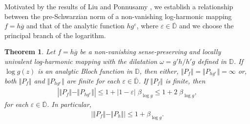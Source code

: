 \documentclass[12pt,reqno]{amsart}
\newtheorem{thm}{Theorem}[section]
\newtheorem{open problem}{Open problem}[section]
\newcommand{\ol}{\overline}
\newcommand{\beas}{\begin{eqnarray*}}
\newcommand{\eeas}{\end{eqnarray*}}
\renewcommand{\epsilon}{\varepsilon}
\numberwithin{equation}{section}
\begin{document}
\noindent Motivated by the results of Liu and Ponnusamy \cite{2LP2018}, we establish a relationship between the pre-Schwarzian norm of a non-vanishing log-harmonic mapping $f = h\overline{g}$ and that of the analytic function $hg^{\epsilon}$, where $\epsilon \in \overline{\mathbb{D}}$ and we choose the principal branch of the logarithm.
\begin{thm}\label{Th1}
Let $f=h\overline{g}$ be a non-vanishing sense-preserving and locally univalent log-harmonic mapping with the dilatation $\omega=g'h/h'g$ defined in $\mathbb{D}$. If $\log{g(z)}$ is an analytic Bloch function in $\mathbb{D}$, then either, $\Vert P_f \Vert =\Vert P_{hg^{\epsilon}}\Vert =\infty$ or, both $\Vert P_f \Vert $ and $\Vert P_{hg^{\epsilon}}\Vert $ are finite for each $\epsilon\in\ol{\mathbb{D}}$. If $\Vert P_f \Vert $ is finite, then
\beas
\left|\Vert P_f \Vert -\Vert P_{hg^{\epsilon}}\Vert \right|\leq 1+|1-\epsilon|\;\beta_{\log{g}}\leq 1+2\;\beta_{\log{g}},
\eeas
for each $\epsilon\in\ol{\mathbb{D}}$. 
In particular,
\beas
\left|\Vert P_f \Vert -\Vert P_{h}\Vert \right|\leq 1+\beta_{\log{g}}.\eeas
\end{thm}
\end{document}
